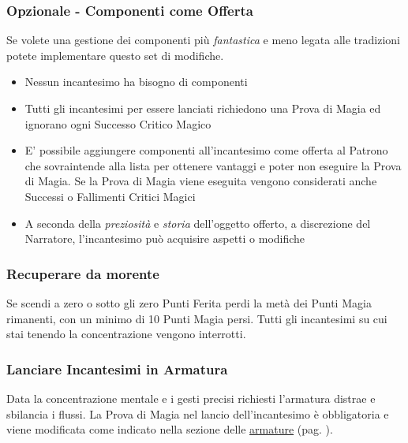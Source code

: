 \begin{multicols}{2}
\subsubsection{Opzionale - Componenti come Offerta}\label{componenticomeofferta}\hypertarget{componenticomeofferta}{}

Se volete una gestione dei componenti più \emph{fantastica} e meno legata alle tradizioni potete implementare questo set di modifiche.

\begin{itemize}[leftmargin=*] \setlength{\itemsep}{0pt}
\item Nessun incantesimo ha bisogno di componenti
\item Tutti gli incantesimi per essere lanciati richiedono una Prova di Magia ed ignorano ogni Successo Critico Magico
\item E' possibile aggiungere componenti all'incantesimo come offerta al Patrono che sovraintende alla lista per ottenere vantaggi e poter non eseguire la Prova di Magia. Se la Prova di Magia viene eseguita vengono considerati anche Successi o Fallimenti Critici Magici
\item A seconda della \emph{preziosità} e \emph{storia} dell'oggetto offerto, a discrezione del Narratore, l'incantesimo può acquisire aspetti o modifiche
\end{itemize}

\subsubsection{Recuperare da morente}\label{magieessereucciso}

Se scendi a zero o sotto gli zero Punti Ferita perdi la metà dei Punti Magia rimanenti, con un minimo di 10 Punti Magia persi. Tutti gli incantesimi su cui stai tenendo la concentrazione vengono interrotti.

\subsubsection{Lanciare Incantesimi in Armatura}\label{magielanciareincantesimiinarmatura}

Data la concentrazione mentale e i gesti precisi richiesti l'armatura distrae e sbilancia i flussi. La Prova di Magia nel lancio dell'incantesimo è obbligatoria e viene modificata come indicato nella sezione delle \hyperlink{armatureemagie}{armature} (pag. \pageref{armatureemagie}).


\end{multicols}
